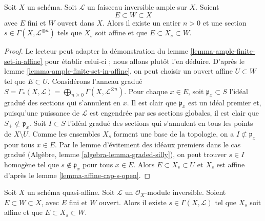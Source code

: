 \begin{lemma}
\label{lemma-ample-finite-set-in-principal-affine}
Soit $X$ un schéma. Soit $\mathcal{L}$ un faisceau inversible ample sur $X$.
Soient
$$
E \subset W \subset X
$$
avec $E$ fini et $W$ ouvert dans $X$. Alors il existe un entier $n > 0$
et une section $s \in \Gamma(X, \mathcal{L}^{\otimes n})$ tels que
$X_s$ soit affine et que $E \subset X_s \subset W$.
\end{lemma}

\begin{proof}
Le lecteur peut adapter la démonstration du lemme \ref{lemma-ample-finite-set-in-affine}
pour établir celui-ci ; nous allons plutôt l'en déduire.
D'après le lemme \ref{lemma-ample-finite-set-in-affine}, on peut choisir un
ouvert affine $U \subset W$ tel que $E \subset U$.
Considérons l'anneau gradué $S = \Gamma_*(X, \mathcal{L}) =
\bigoplus_{n \geq 0} \Gamma(X, \mathcal{L}^{\otimes n})$.
Pour chaque $x \in E$, soit $\mathfrak p_x \subset S$ l'idéal gradué
des sections qui s'annulent en $x$. Il est clair que $\mathfrak p_x$ est
un idéal premier et, puisqu'une puissance de $\mathcal{L}$ est engendrée par
ses sections globales, il est clair que $S_{+} \not \subset \mathfrak p_x$.
Soit $I \subset S$ l'idéal gradué des sections qui s'annulent en tous
les points de $X \setminus U$. Comme les ensembles $X_s$ forment une base
de la topologie, on a $I \not \subset \mathfrak p_x$ pour
tous $x \in E$.
Par le lemme d'évitement des idéaux premiers dans le cas gradué (Algèbre, lemme \ref{algebra-lemma-graded-silly}),
on peut trouver $s \in I$ homogène
tel que $s \not \in \mathfrak p_x$ pour tous $x \in E$.
Alors $E \subset X_s \subset U$ et $X_s$ est affine d'après le
lemme \ref{lemma-affine-cap-s-open}.
\end{proof}

\begin{lemma}
\label{lemma-quasi-affine-invertible-nonvanishing-section}
Soit $X$ un schéma quasi-affine. Soit $\mathcal{L}$ un
$\mathcal{O}_X$-module inversible. Soient $E \subset W \subset X$, avec $E$ fini
et $W$ ouvert. Alors il existe $s \in \Gamma(X, \mathcal{L})$
tel que $X_s$ soit affine et que $E \subset X_s \subset W$.
\end{lemma}

